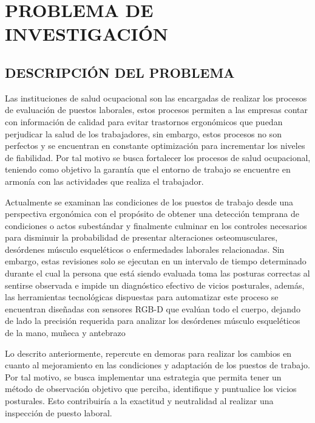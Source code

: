 \chapter{PROBLEMA DE INVESTIGACIÓN}

\section{DESCRIPCIÓN DEL PROBLEMA}
Las instituciones de salud ocupacional son las encargadas de realizar los procesos de evaluación de puestos laborales, estos procesos permiten a las empresas contar con información de calidad para evitar trastornos ergonómicos que puedan perjudicar la salud de los trabajadores, sin embargo, estos procesos no son perfectos y se encuentran en constante optimización para incrementar los niveles de fiabilidad. Por tal motivo se busca fortalecer los procesos de salud ocupacional, teniendo como objetivo la garantía que el entorno de trabajo se encuentre en armonía con las actividades que realiza el trabajador. %

Actualmente se examinan las condiciones de los puestos de trabajo desde una perspectiva ergonómica con el propósito de obtener una detección temprana de condiciones o actos subestándar y finalmente culminar en los controles necesarios para disminuir la probabilidad de presentar alteraciones osteomusculares, desórdenes músculo esqueléticos o enfermedades laborales relacionadas. Sin embargo, estas revisiones solo se ejecutan en un intervalo de tiempo determinado durante el cual la persona que está siendo evaluada toma las posturas correctas al sentirse observada e impide un diagnóstico efectivo de vicios posturales, además, las herramientas tecnológicas dispuestas para automatizar este proceso se encuentran diseñadas con sensores RGB-D que evalúan todo el cuerpo, dejando de lado la precisión requerida para analizar los desórdenes músculo esqueléticos de la mano, muñeca y antebrazo

Lo descrito anteriormente, repercute en demoras para realizar los cambios en cuanto al mejoramiento en las condiciones y adaptación de los puestos de trabajo. Por tal motivo, se busca implementar una estrategia que permita tener un método de observación objetivo que perciba, identifique y puntualice los vicios posturales. Esto contribuiría a la exactitud y neutralidad al realizar una inspección de puesto laboral.


